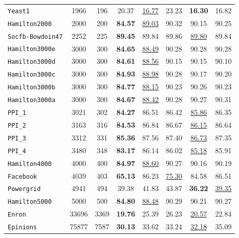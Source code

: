 \documentclass{article}
\begin{document}
\begin{table}[h]
\begin{minipage}{0.49\linewidth}
{\begin{tabular}{l|c|c|c|c|c|c|c}
        \texttt{Yeast1} & 1966 & 196 & 20.37 & \underline{16.77} & 23.23 & \textbf{16.30} & 16.82 \\
        \texttt{Hamilton2000} & 2000 & 200 & \textbf{84.57} & \underline{89.03} & 90.32 & 90.15 & 90.25 \\
        \texttt{Socfb-Bowdoin47} & 2252 & 225 & \textbf{89.45} & 89.84 & 89.86 & \underline{89.80} & 89.84 \\
        \texttt{Hamilton3000e} & 3000 & 300 & \textbf{84.65} & \underline{88.49} & 90.28 & 90.28 & 90.28 \\
        \texttt{Hamilton3000d} & 3000 & 300 & \textbf{84.61} & \underline{88.56} & 90.15 & 90.15 & 90.10 \\
        \texttt{Hamilton3000c} & 3000 & 300 & \textbf{84.93} & \underline{88.98} & 90.28 & 90.17 & 90.20 \\
        \texttt{Hamilton3000b} & 3000 & 300 & \textbf{84.77} & \underline{88.15} & 90.23 & 90.26 & 90.23 \\
        \texttt{Hamilton3000a} & 3000 & 300 & \textbf{84.67} & \underline{88.42} & 90.28 & 90.27 & 90.31 \\
        \texttt{PPI\_1} & 3021 & 302 & \textbf{84.27} & 86.51 & 86.42 & \underline{85.86} & 86.35 \\
        \texttt{PPI\_2} & 3163 & 316 & \textbf{84.53} & 86.84 & 86.67 & \underline{86.15} & 86.64 \\
        \texttt{PPI\_3} & 3312 & 331 & \textbf{85.36} & 87.56 & 87.40 & \underline{86.73} & 87.35 \\
        \texttt{PPI\_4} & 3480 & 348 & \textbf{83.17} & 86.14 & 86.02 & \underline{85.18} & 85.91 \\
        \texttt{Hamilton4000} & 4000 & 400 & \textbf{84.97} & \underline{88.60} & 90.27 & 90.16 & 90.19 \\
        \texttt{Facebook} & 4039 & 403 & \textbf{65.13} & 86.23 & \underline{75.30} & 84.58 & 86.51 \\
        \texttt{Powergrid} & 4941 & 494 & 39.38 & 41.83 & 43.87 & \textbf{36.22} & \underline{39.35} \\
        \texttt{Hamilton5000} & 5000 & 500 & \textbf{84.80} & \underline{88.48} & 90.29 & 90.21 & 90.27 \\
        \texttt{Enron} & 33696 & 3369 & \textbf{19.76} & 25.39 & 26.23 & \underline{20.57} & 22.84 \\
        \texttt{Epinions} & 75877 & 7587 & \textbf{30.13} & 33.62 & 33.24 & \underline{32.18} & 35.09 \\

\end{tabular}}
\end{minipage}
\end{table}
\end{document}

